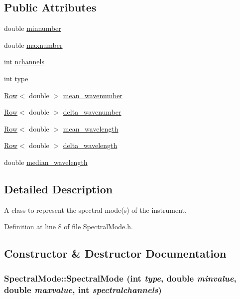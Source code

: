 \subsection*{Public Attributes}
\begin{DoxyCompactItemize}
\item 
double \hyperlink{classSpectralMode_a702eb517e9b821c6fc6508fa6b96579c}{minnumber}
\item 
double \hyperlink{classSpectralMode_aa0e01cba630aff89cf934470513e7f89}{maxnumber}
\item 
int \hyperlink{classSpectralMode_a7c68010a64d612a452df276003689eca}{nchannels}
\item 
int \hyperlink{classSpectralMode_a7720aa3a3f0d28c755169f86a3125d58}{type}
\item 
\hyperlink{classRow}{Row}$<$ double $>$ \hyperlink{classSpectralMode_ad32246c8a4ebe1bfdc7879849fa6fd6f}{mean\_\-wavenumber}
\item 
\hyperlink{classRow}{Row}$<$ double $>$ \hyperlink{classSpectralMode_a79cec2adab5afc8d84f09bd3f4a222d3}{delta\_\-wavenumber}
\item 
\hyperlink{classRow}{Row}$<$ double $>$ \hyperlink{classSpectralMode_af83f2181ef2b8660feac40e7691893d6}{mean\_\-wavelength}
\item 
\hyperlink{classRow}{Row}$<$ double $>$ \hyperlink{classSpectralMode_af4835d0dd1c5276798e400f3bcfa1bb7}{delta\_\-wavelength}
\item 
double \hyperlink{classSpectralMode_a8c817cc0d2f5d57823a03256743260b3}{median\_\-wavelength}
\end{DoxyCompactItemize}


\subsection{Detailed Description}
A class to represent the spectral mode(s) of the instrument. 

Definition at line 8 of file SpectralMode.h.



\subsection{Constructor \& Destructor Documentation}
\hypertarget{classSpectralMode_aa8c39bc91262a9fe5b840f10c41b301a}{
\subsubsection[{SpectralMode}]{\setlength{\rightskip}{0pt plus 5cm}SpectralMode::SpectralMode (int {\em type}, \/  double {\em minvalue}, \/  double {\em maxvalue}, \/  int {\em spectralchannels})}}
\label{classSpectralMode_aa8c39bc91262a9fe5b840f10c41b301a}


